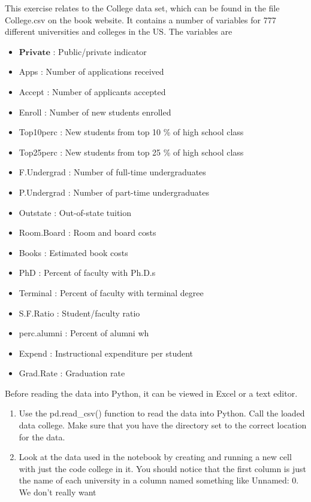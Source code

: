 	\begin{exercise}[2.8]
		This exercise relates to the College data set, which can be found in
		the file College.csv on the book website. It contains a number of
		variables for 777 different universities and colleges in the US. The
		variables are
		\begin{itemize}
			\item $\mathbf{Private}$ : Public/private indicator
			\item Apps : Number of applications received
			\item Accept : Number of applicants accepted
			\item Enroll : Number of new students enrolled
			\item Top10perc : New students from top 10 \% of high school class
			\item Top25perc : New students from top 25 \% of high school class
			\item F.Undergrad : Number of full-time undergraduates
			\item P.Undergrad : Number of part-time undergraduates
			\item Outstate : Out-of-state tuition
			\item Room.Board : Room and board costs
			\item Books : Estimated book costs
			\item PhD : Percent of faculty with Ph.D.s
			\item  Terminal : Percent of faculty with terminal degree
			\item S.F.Ratio : Student/faculty ratio
			\item perc.alumni : Percent of alumni wh
			\item Expend : Instructional expenditure per student
			\item Grad.Rate : Graduation rate
		\end{itemize}
	 Before reading the data into Python, it can be viewed in Excel or a
	 text editor.
	\begin{enumerate}[label=(\alph*)]
		\item  Use the pd.read\_csv() function to read the data into Python. Call
		the loaded data college. Make sure that you have the directory
		set to the correct location for the data.
		\item Look at the data used in the notebook by creating and running
		a new cell with just the code college in it. You should notice
		that the first column is just the name of each university in a
		column named something like Unnamed: 0. We don’t really want

\end{enumerate}
\end{exercise}
